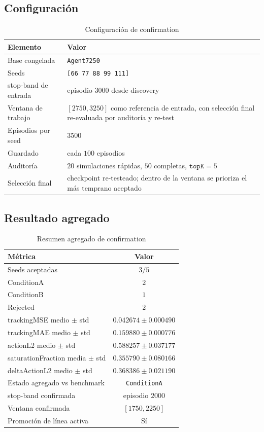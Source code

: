 \documentclass[11pt,a4paper]{article}
\begin{document}
\subsection*{Configuraci\'on}
\begin{table}[H]
\centering
\caption{Configuraci\'on de confirmation}
\begin{tabularx}{\linewidth}{lY}
\toprule
Elemento & Valor \\
\midrule
Base congelada & \texttt{Agent7250} \\
Seeds & \texttt{[66 77 88 99 111]} \\
stop-band de entrada & episodio \(3000\) desde discovery \\
Ventana de trabajo & \([2750, 3250]\) como referencia de entrada, con selecci\'on final re-evaluada por auditor\'ia y re-test \\
Episodios por seed & \(3500\) \\
Guardado & cada \(100\) episodios \\
Auditor\'ia & \(20\) simulaciones r\'apidas, \(50\) completas, \(\texttt{topK}=5\) \\
Selecci\'on final & checkpoint re-testeado; dentro de la ventana se prioriza el m\'as temprano aceptado \\
\bottomrule
\end{tabularx}
\end{table}

\subsection*{Resultado agregado}
\begin{table}[H]
\centering
\caption{Resumen agregado de confirmation}
\begin{tabularx}{\linewidth}{l c}
\toprule
M\'etrica & Valor \\
\midrule
Seeds aceptadas & \(3/5\) \\
ConditionA & \(2\) \\
ConditionB & \(1\) \\
Rejected & \(2\) \\
trackingMSE medio \(\pm\) std & \(0.042674 \pm 0.000490\) \\
trackingMAE medio \(\pm\) std & \(0.159880 \pm 0.000776\) \\
actionL2 medio \(\pm\) std & \(0.588257 \pm 0.037177\) \\
saturationFraction media \(\pm\) std & \(0.355790 \pm 0.080166\) \\
deltaActionL2 medio \(\pm\) std & \(0.368386 \pm 0.021190\) \\
Estado agregado vs benchmark & \texttt{ConditionA} \\
stop-band confirmada & episodio \(2000\) \\
Ventana confirmada & \([1750, 2250]\) \\
Promoci\'on de l\'inea activa & S\'i \\
\bottomrule
\end{tabularx}
\end{table}
\end{document}
